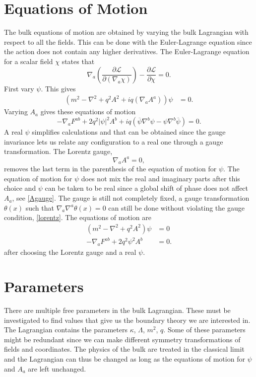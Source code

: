 \documentclass[12pt]{report}
\renewcommand{\i}{\ensuremath{i}}
\begin{document}
\section{Equations of Motion}
The bulk equations of motion are obtained by varying the bulk Lagrangian with respect to all the fields. This can be done with the Euler-Lagrange equation since the action does not contain any higher derivatives. The Euler-Lagrange equation for a scalar field $\chi$ states that
\begin{equation}
 \nabla_a\left(\frac{\partial\mathcal{L}}{\partial(\nabla_a\chi)}\right)-\frac{\partial\mathcal{L}}{\partial\chi}=0.
\end{equation}
First vary $\psi$. This gives
\begin{equation}
\begin{split}
\left(m^2-\nabla^2+q^2A^2+\i q(\nabla_aA^a)\right)\psi&=0.
\end{split}
\end{equation}
Varying $A_a$ gives these equations of motion
\begin{equation}
 -\nabla_aF^{ab}+2q^2|\psi|^2A^b+iq\left(\overline{\psi}\nabla^b\psi-\psi\nabla^b\overline{\psi}\right)=0.
\end{equation}
A real $\psi$ simplifies calculations and that can be obtained since the gauge invariance lets us relate any configuration to a real one through a gauge transformation. The Lorentz gauge,
\begin{equation}
 \nabla_aA^a=0\label{lorentz},
\end{equation}
removes the last term in the parenthesis of the equation of motion for $\psi$. The equation of motion for $\psi$ does not mix the real and imaginary parts after this choice and $\psi$ can be taken to be real since a global shift of phase does not affect $A_a$, see \eqref{Agauge}. The gauge is still not completely fixed, a gauge transformation $\theta(x)$ such that $\nabla_a\nabla^a\theta(x)=0$ can still be done without violating the gauge condition, \eqref{lorentz}. The equations of motion are
\begin{equation}
\begin{split}
\left(m^2-\nabla^2+q^2A^2\right)\psi&=0\\
-\nabla_aF^{ab}+2q^2\psi^2A^b&=0.
\end{split}\label{eqm}
\end{equation}
after choosing the Lorentz gauge and a real $\psi$.
\section{Parameters}
There are multiple free parameters in the bulk Lagrangian. These must be investigated to find values that give us the boundary theory we are interested in. The Lagrangian contains the parameters $\kappa$, $\Lambda$, $m^2$, $q$. Some of these parameters might be redundant since we can make different symmetry transformations of fields and coordinates. The physics of the bulk are treated in the classical limit and the Lagrangian can thus be changed as long as the equations of motion for $\psi$ and $A_a$ are left unchanged.
\end{document}

